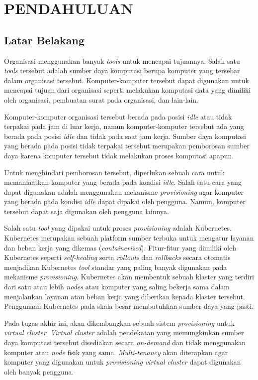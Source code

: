 \chapter{PENDAHULUAN}
\label{chap:pendahuluan}

\section{Latar Belakang}
\label{sec:latarbelakang}

Organisasi menggunakan banyak \emph{tools} untuk mencapai
tujuannya. Salah satu \emph{tools} tersebut adalah sumber daya
komputasi berupa komputer yang tersebar dalam organisasi tersebut. Komputer-komputer
tersebut dapat digunakan untuk mencapai tujuan dari organisasi seperti 
melakukan komputasi data yang dimiliki oleh organisasi, pembuatan
surat pada organisasi, dan lain-lain.

Komputer-komputer organisasi tersebut berada pada posisi
\emph{idle} atau tidak terpakai pada jam di luar kerja, namun
komputer-komputer tersebut ada yang berada pada posisi \emph{idle}
dan tidak pada saat jam kerja. Sumber daya komputasi yang berada
pada posisi tidak terpakai tersebut merupakan pemborosan sumber
daya karena komputer tersebut tidak melakukan proses komputasi apapun.

Untuk menghindari pemborosan tersebut, diperlukan sebuah cara untuk
memanfaatkan komputer yang berada pada kondisi \emph{idle}. Salah satu
cara yang dapat digunakan adalah menggunakan mekanisme \emph{provisioning}
agar komputer yang berada pada kondisi \emph{idle} dapat dipakai oleh
pengguna. Namun, komputer tersebut dapat saja digunakan oleh pengguna lainnya.

Salah satu \emph{tool} yang dipakai untuk proses \emph{provisioning} adalah
Kubernetes. Kubernetes merupakan sebuah platform sumber terbuka untuk mengatur
layanan dan beban kerja yang dikemas (\emph{containerized}). Fitur-fitur
yang dimiliki oleh Kubernetes seperti \emph{self-healing} serta \emph{rollouts}
dan \emph{rollbacks} secara otomatis menjadikan Kubernetes \emph{tool} standar
yang paling banyak digunakan pada mekanisme \emph{provisioning}. Kubernetes akan
membentuk sebuah klaster yang terdiri dari satu atau lebih \emph{nodes} atau
komputer yang saling bekerja sama dalam menjalankan layanan atau beban kerja
yang diberikan kepada klaster tersebut. Penggunaan Kubernetes pada skala besar
membutuhkan sumber daya yang pasti.

Pada tugas akhir ini, akan dikembangkan sebuah sistem \emph{provisioning} untuk \emph{virtual cluster}.
\emph{Virtual cluster} adalah pendekatan yang memungkinkan sumber daya komputasi tersebut disediakan
secara \emph{on-demand} dan tidak menggunakan komputer atau \emph{node} fisik yang sama. \emph{Multi-tenancy}
akan diterapkan agar komputer yang digunakan untuk \emph{provisioning virtual cluster} dapat digunakan
oleh banyak pengguna.

